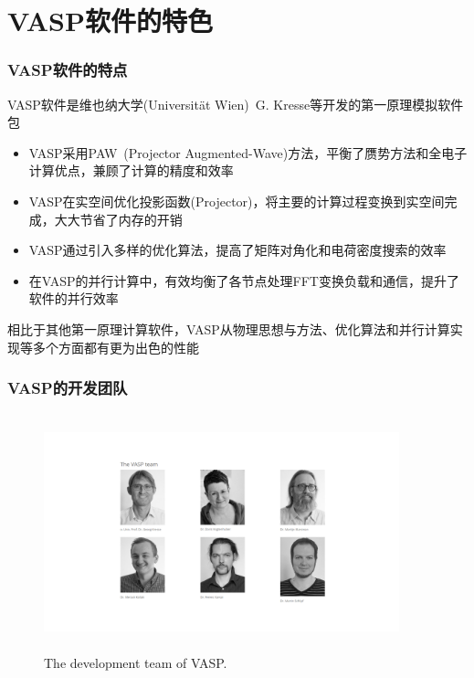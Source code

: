 \section{\rm{VASP}软件的特色}
\frame
{
	\frametitle{\textrm{VASP}软件的特点}
	\textrm{VASP}软件是维也纳大学\textrm{(Universit\"at Wien)}~\textrm{G. Kresse}等开发的第一原理模拟软件包
	\begin{itemize}
		\item \textrm{VASP}采用\textrm{PAW~(Projector Augmented-Wave)}方法，平衡了赝势方法和全电子计算优点，兼顾了计算的精度和效率
		\item \textrm{VASP}在实空间优化投影函数\textrm{(Projector)}，将主要的计算过程变换到实空间完成，大大节省了内存的开销%
		\item \textrm{VASP}通过引入多样的优化算法，提高了矩阵对角化和电荷密度搜索的效率
		\item 在\textrm{VASP}的并行计算中，有效均衡了各节点处理\textrm{FFT}变换负载和通信，提升了软件的并行效率
	\end{itemize}
	相比于其他第一原理计算软件，\textrm{VASP}从物理思想与方法、优化算法和并行计算实现等多个方面都有更为出色的性能
}

\frame
{
	\frametitle{\textrm{VASP}的开发团队}
\begin{figure}[h!]
\centering
\vspace*{-0.25in}
\includegraphics[height=2.70in,width=4.05in,viewport=330 130 1280 770,clip]{Figures/VASP_team.png}
\caption{\tiny \textrm{The development team of VASP.}}%
\label{VASP_team}
\end{figure}
}

